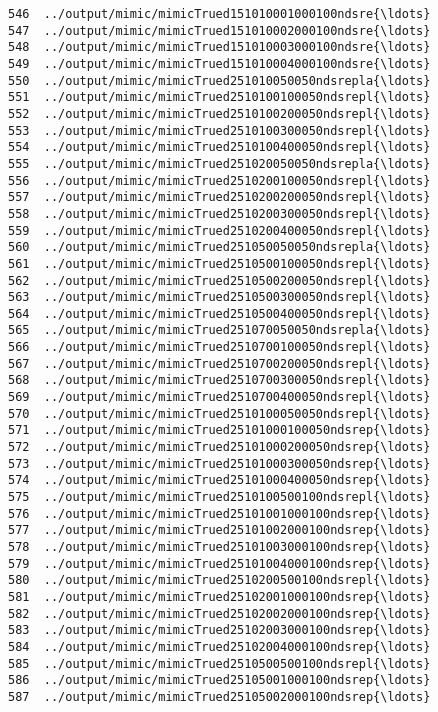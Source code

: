 \documentclass[11pt]{article}
\begin{document}
\begin{Verbatim}[commandchars=\\\{\}]
546  ../output/mimic/mimicTrued151010001000100ndsre{\ldots}  
547  ../output/mimic/mimicTrued151010002000100ndsre{\ldots}  
548  ../output/mimic/mimicTrued151010003000100ndsre{\ldots}  
549  ../output/mimic/mimicTrued151010004000100ndsre{\ldots}  
550  ../output/mimic/mimicTrued251010050050ndsrepla{\ldots}  
551  ../output/mimic/mimicTrued2510100100050ndsrepl{\ldots}  
552  ../output/mimic/mimicTrued2510100200050ndsrepl{\ldots}  
553  ../output/mimic/mimicTrued2510100300050ndsrepl{\ldots}  
554  ../output/mimic/mimicTrued2510100400050ndsrepl{\ldots}  
555  ../output/mimic/mimicTrued251020050050ndsrepla{\ldots}  
556  ../output/mimic/mimicTrued2510200100050ndsrepl{\ldots}  
557  ../output/mimic/mimicTrued2510200200050ndsrepl{\ldots}  
558  ../output/mimic/mimicTrued2510200300050ndsrepl{\ldots}  
559  ../output/mimic/mimicTrued2510200400050ndsrepl{\ldots}  
560  ../output/mimic/mimicTrued251050050050ndsrepla{\ldots}  
561  ../output/mimic/mimicTrued2510500100050ndsrepl{\ldots}  
562  ../output/mimic/mimicTrued2510500200050ndsrepl{\ldots}  
563  ../output/mimic/mimicTrued2510500300050ndsrepl{\ldots}  
564  ../output/mimic/mimicTrued2510500400050ndsrepl{\ldots}  
565  ../output/mimic/mimicTrued251070050050ndsrepla{\ldots}  
566  ../output/mimic/mimicTrued2510700100050ndsrepl{\ldots}  
567  ../output/mimic/mimicTrued2510700200050ndsrepl{\ldots}  
568  ../output/mimic/mimicTrued2510700300050ndsrepl{\ldots}  
569  ../output/mimic/mimicTrued2510700400050ndsrepl{\ldots}  
570  ../output/mimic/mimicTrued2510100050050ndsrepl{\ldots}  
571  ../output/mimic/mimicTrued25101000100050ndsrep{\ldots}  
572  ../output/mimic/mimicTrued25101000200050ndsrep{\ldots}  
573  ../output/mimic/mimicTrued25101000300050ndsrep{\ldots}  
574  ../output/mimic/mimicTrued25101000400050ndsrep{\ldots}  
575  ../output/mimic/mimicTrued2510100500100ndsrepl{\ldots}  
576  ../output/mimic/mimicTrued25101001000100ndsrep{\ldots}  
577  ../output/mimic/mimicTrued25101002000100ndsrep{\ldots}  
578  ../output/mimic/mimicTrued25101003000100ndsrep{\ldots}  
579  ../output/mimic/mimicTrued25101004000100ndsrep{\ldots}  
580  ../output/mimic/mimicTrued2510200500100ndsrepl{\ldots}  
581  ../output/mimic/mimicTrued25102001000100ndsrep{\ldots}  
582  ../output/mimic/mimicTrued25102002000100ndsrep{\ldots}  
583  ../output/mimic/mimicTrued25102003000100ndsrep{\ldots}  
584  ../output/mimic/mimicTrued25102004000100ndsrep{\ldots}  
585  ../output/mimic/mimicTrued2510500500100ndsrepl{\ldots}  
586  ../output/mimic/mimicTrued25105001000100ndsrep{\ldots}  
587  ../output/mimic/mimicTrued25105002000100ndsrep{\ldots}  

\end{Verbatim}
\end{document}

